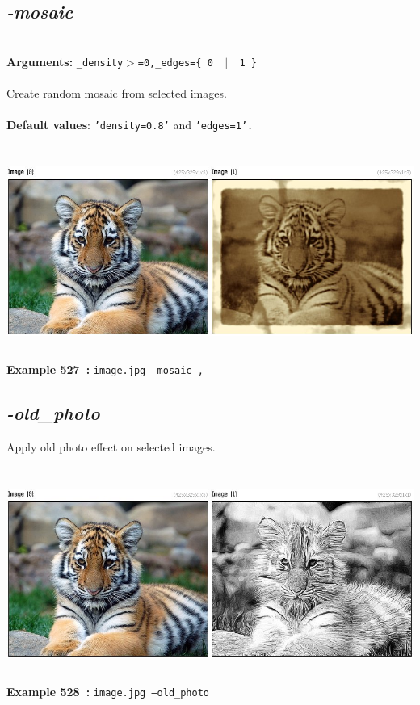 \documentclass[a4paper,11pt,twoside]{book}
\begin{document}
\subsection{\emph{-mosaic} }\vspace*{-0.5em}
~\\\textbf{Arguments: } 
{\small \texttt{\_density$>$=0,\_edges=\{ 0 ~$|$~ 1 \}}}\\~\\
Create random mosaic from selected images.
~\\~\\\textbf{Default values}: {\small \texttt{'density=0.8'} and \texttt{'edges=1'.}}
\begin{center}\includegraphics[keepaspectratio=true,height=7cm,width=\textwidth]{img/gmic_def527.jpg}\\
{\footnotesize \textbf{Example 527~:} \texttt{image.jpg --mosaic ,}}
\end{center}

\subsection{\emph{-old\_photo} }\vspace*{-0.5em}
Apply old photo effect on selected images.
\begin{center}\includegraphics[keepaspectratio=true,height=7cm,width=\textwidth]{img/gmic_def528.jpg}\\
{\footnotesize \textbf{Example 528~:} \texttt{image.jpg --old\_photo}}
\end{center}
\end{document}
